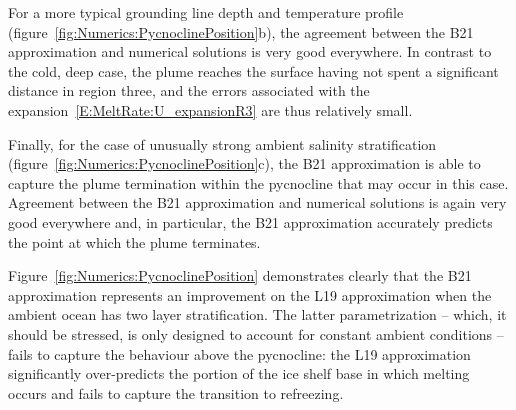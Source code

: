 \documentclass{jfm}
\begin{document}
For a more typical grounding line depth and temperature profile (figure~\ref{fig:Numerics:PycnoclinePosition}b), the agreement between the B21 approximation and numerical solutions is very good everywhere. In contrast to the cold, deep case, the plume reaches the surface having not spent a significant distance in region three, and the errors associated with the expansion~\eqref{E:MeltRate:U_expansionR3} are thus relatively small.

Finally, for the case of unusually strong ambient salinity stratification (figure~\ref{fig:Numerics:PycnoclinePosition}c), the B21 approximation is able to capture the plume termination within the pycnocline that may occur in this case. Agreement between the B21 approximation and numerical solutions is again very good everywhere and, in particular, the B21 approximation accurately predicts the point at which the plume terminates.

Figure~\ref{fig:Numerics:PycnoclinePosition} demonstrates clearly that the B21 approximation represents an improvement on the L19 approximation when the ambient ocean has two layer stratification. The latter parametrization -- which, it should be stressed, is only designed to account for constant ambient conditions -- fails to capture the behaviour above the pycnocline: the L19 approximation significantly over-predicts the portion of the ice shelf base in which melting occurs and fails to capture the transition to refreezing.
\end{document}
